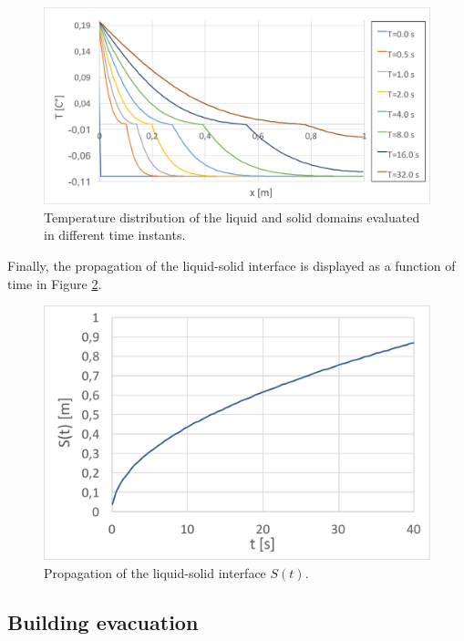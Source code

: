 \documentclass[a4paper,12pt,openany]{book}
\theoremstyle{break}
\begin{document}
\begin{figure}[H]
  \includegraphics[scale=0.5]{stefan_problem_result.pdf}
  \centering
  \caption{Temperature distribution of the liquid and solid domains evaluated in different time instants.}
  \label{fig:stefan_problem_result}
\end{figure}\vspace*{3pt}

Finally, the propagation of the liquid-solid interface is displayed as a function of time in Figure \ref{fig:stefan_problem_result_s}.
\begin{figure}[H]
  \includegraphics[scale=0.5]{stefan_problem_result_s.pdf}
  \centering
  \caption{Propagation of the liquid-solid interface $S(t)$.}
  \label{fig:stefan_problem_result_s}
\end{figure}\vspace*{3pt}


\subsection{Building evacuation} \label{sec:SFM_example}
\end{document}
